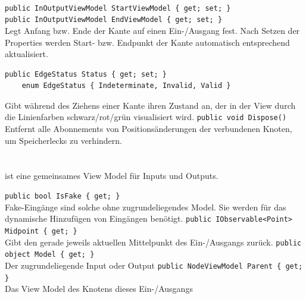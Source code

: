 \paragraph{}
\begin{itemize}
	\add \verb!public InOutputViewModel StartViewModel { get; set; }! \\
	     \verb!public InOutputViewModel EndViewModel { get; set; }! \\
	Legt Anfang bzw. Ende der Kante auf einen Ein-/Ausgang fest. Nach Setzen der Properties werden Start- bzw. Endpunkt der Kante automatisch entsprechend aktualisiert.
	\add \begin{verbatim}public EdgeStatus Status { get; set; }
	enum EdgeStatus { Indeterminate, Invalid, Valid }
	\end{verbatim}
	Gibt während des Ziehens einer Kante ihren Zustand an, der in der View durch die Linienfarben schwarz/rot/grün visualisiert wird.
	\add \verb!public void Dispose()! \\
	Entfernt alle Abonnements von Positionsänderungen der verbundenen Knoten, um Speicherlecks zu verhindern.
\end{itemize}

\paragraph{}~\\
 ist eine gemeinsames View Model für Inputs und Outputs.
\begin{itemize}
	\add \verb!public bool IsFake { get; }! \\
	Fake-Eingänge sind solche ohne zugrundeliegendes Model. Sie werden für das dynamische Hinzufügen von Eingängen benötigt.
	\add \verb!public IObservable<Point> Midpoint { get; }! \\
	Gibt den gerade jeweils aktuellen Mittelpunkt des Ein-/Ausgangs zurück.
	\add \verb!public object Model { get; }! \\
	Der zugrundeliegende Input oder Output
	\add \verb!public NodeViewModel Parent { get; }! \\
	Das View Model des Knotens dieses Ein-/Ausgangs
\end{itemize}

